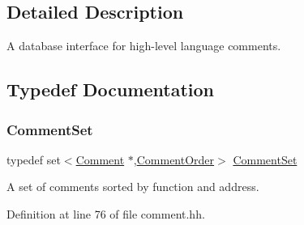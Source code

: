 \subsection{Detailed Description}
A database interface for high-\/level language comments. 



\subsection{Typedef Documentation}
\mbox{\label{comment_8hh_ae1761d5e0f74b5d5ced1d74ec869cc73}} 
\subsubsection{\texorpdfstring{CommentSet}{CommentSet}}
{\footnotesize\ttfamily typedef set$<$\mbox{\hyperlink{class_comment}{Comment}} $\ast$,\mbox{\hyperlink{struct_comment_order}{Comment\+Order}}$>$ \mbox{\hyperlink{comment_8hh_ae1761d5e0f74b5d5ced1d74ec869cc73}{Comment\+Set}}}



A set of comments sorted by function and address. 



Definition at line 76 of file comment.\+hh.

